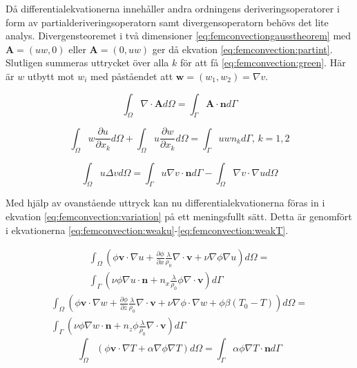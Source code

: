 \noindent
Då differentialekvationerna innehåller andra ordningens deriveringsoperatorer i form av
partialderiveringsoperatorn samt divergensoperatorn behövs det lite analys.
Divergensteoremet i två dimensioner \eqref{eq:femconvectiongausstheorem}
med $\mathbf{A} = (uw, 0)$ eller $\mathbf{A} = (0, uw)$ ger då ekvation
\eqref{eq:femconvection:partint}. Slutligen summeras uttrycket över alla
$k$ för att få \eqref{eq:femconvection:green}. Här är $w$ utbytt mot $w_i$ med
påståendet att $\mathbf{w} = (w_1, w_2) = \nabla v$. \cite{johnson2009}

\begin{equation}
\label{eq:femconvectiongausstheorem}
\int_\Omega \nabla\cdot \mathbf{A} d\Omega = \int_\Gamma \mathbf{A}\cdot\mathbf{n} d\Gamma
\end{equation} 

\begin{equation}
\label{eq:femconvection:partint}
\int_\Omega w\frac{\partial u}{\partial x_k} d\Omega +
\int_\Omega u\frac{\partial w}{\partial x_k} d\Omega =
\int_\Gamma uwn_k d\Gamma\mbox{,   }k=1,2
\end{equation}

\begin{equation}
\label{eq:femconvection:green}
\int_\Omega u\Delta v d\Omega =
\int_\Gamma u\nabla v\cdot\mathbf{n}d\Gamma-\int_\Omega \nabla v\cdot\nabla u d\Omega
\end{equation}

\noindent
Med hjälp av ovanstående uttryck kan nu differentialekvationerna föras in i
ekvation \eqref{eq:femconvection:variation} på ett meningsfullt sätt. Detta är genomfört i 
ekvationerna \eqref{eq:femconvection:weaku}-\eqref{eq:femconvection:weakT}.

\begin{align}
\int_\Omega \left(\phi\mathbf{v}\cdot\nabla u +
\frac{\partial \phi}{\partial x}\frac{\lambda}{\rho_0}\nabla\cdot\mathbf{v}
+\nu\nabla\phi\nabla u\right)d\Omega = \nonumber \\
\int_\Gamma\left( \nu\phi\nabla u\cdot\mathbf{n} +
n_x\frac{\lambda}{\rho_0}\phi\nabla\cdot\mathbf{v}\right)d\Gamma
\label{eq:femconvection:weaku}
\end{align}
\begin{align}
\int_\Omega\left(\phi\mathbf{v}\cdot\nabla w
+ \frac{\partial \phi}{\partial z} \frac{\lambda}{\rho_0}\nabla\cdot\mathbf{v}
+ \nu\nabla\phi\cdot\nabla w + \phi\beta(T_0-T)\right)d\Omega
= \nonumber \\
\int_\Gamma\left(\nu\phi\nabla w\cdot\mathbf{n} +
n_z\phi\frac{\lambda}{\rho_0}\nabla\cdot\mathbf{v}\right)d\Gamma
\label{eq:femconvection:weakw}
\end{align}
\begin{equation}
\int_\Omega\left(\phi\mathbf{v}\cdot\nabla T + \alpha\nabla\phi\nabla T\right)d\Omega
= \int_\Gamma \alpha\phi\nabla T\cdot\mathbf{n}d\Gamma
\label{eq:femconvection:weakT}
\end{equation}



